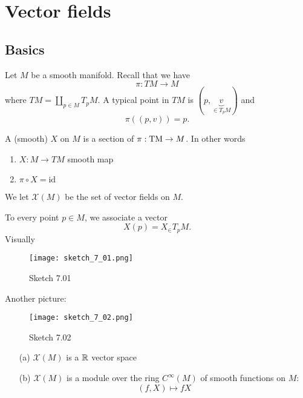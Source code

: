 \chapter{Vector fields}

\section{Basics}

Let \(M\) be a smooth manifold. Recall  that we have 
\[\pi: TM \to M\]
where \(TM=\coprod_{p\in M} T_p M\). A typical point in \(TM\) is \((p,\underbrace{v}_{\in T_pM})\) and 
\[\pi((p,v))=p.\]

\begin{definition*}
    A (smooth)  \(X\) on \(M\) is a 
    section of \(\pi:{\text{TM}}\to M\). In other words 
    \begin{enumerate}
        \item \(X:M\to TM\) smooth map 
        \item \(\pi\circ X=\text{id}\)
    \end{enumerate} 
    We let \(\mathcal{X}(M)\) be the set of vector fields on \(M\).
\end{definition*}

 To every point \(p\in M\), we associate a vector \[X(p)=X_\in T_pM.\]
Visually
\begin{figure}[H]\label{fig:7.01}
    \centering
    \texttt{[image: sketch\_7\_01.png]}
    \caption{Sketch 7.01}
\end{figure}

Another picture:

\begin{figure}[H]\label{fig:7.02}
    \centering
    \texttt{[image: sketch\_7\_02.png]}
    \caption{Sketch 7.02}
\end{figure}

\begin{lemma}\label{lem:7.1}
    \begin{enumerate} Let \(M\) be a smooth manifold.
        \item[(a)] \(\mathcal{X}(M)\) is a \(\mathbb{R}\) vector space 
        \item[(b)] \(\mathcal{X}(M)\) is a module over the ring \(C^{\infty}(M)\) of smooth functions on \(M\):
        \[(f,X)\mapsto fX\] 
    \end{enumerate}
\end{lemma}

